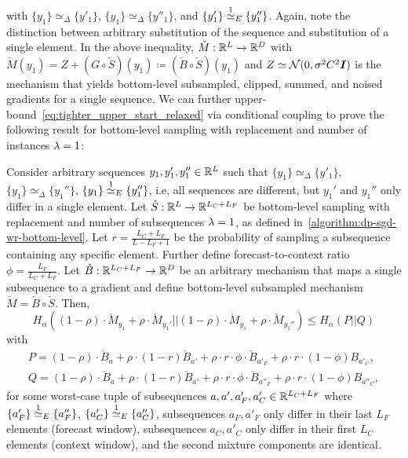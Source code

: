with $\{y_1\} \simeq_\Delta \{y'_1\}$,
$\{y_1\} \simeq_\Delta \{y''_1\}$,
and
$\{y'_1\} \overset{1}{\simeq}_{E} \{y_1''\}$.
Again, note the distinction between arbitrary substitution of the sequence and substitution of a single element. 
In the above inequality, $\check{M} : {\mathbb{R}}^{L} \rightarrow {\mathbb{R}}^{D}$
with $\check{M}(y_1)  = Z + (G \circ \check{S})(y_1) \coloneq (\check{B} \circ \check{S})(y_1)$ and $Z \simeq \mathcal{N}(0, \sigma^2 C^2 {\bm{I}})$
is the mechanism that yields bottom-level subsampled, clipped, summed, and noised gradients for a single sequence.
We can further upper-bound~\cref{eq:tighter_upper_start_relaxed} via conditional coupling to prove the following result for bottom-level sampling with replacement and number of instances $\lambda=1$:
\begin{lemma}\label{lemma:bilevel_reduction_to_single_gradient}
    Consider arbitrary sequences $y_1, y_1', y_1'' \in {\mathbb{R}}^{L}$ such that
    $\{y_1\} \simeq_\Delta \{y'_1\}$,
    $\{y_1\} \simeq_\Delta \{y_1''\}$,
    $\{y_1\} \overset{1}{\simeq}_{E} \{y_1''\}$,
    i.e, all sequences are different, but $y_1'$ and $y_1''$ only differ in a single element.
    Let $\check{S} : {\mathbb{R}}^{L} \rightarrow {\mathbb{R}}^{L_C+L_F}$ be bottom-level sampling with replacement and number of subsequences $\lambda = 1$, as defined in~\cref{algorithm:dp-sgd-wr-bottom-level}.
    Let $r = \frac{L_C + L_F}{L - L_F + 1}$ be the probability of sampling a subsequence containing any specific element.
    Further define forecast-to-context ratio $\phi = \frac{L_F}{L_C + L_F}$.
    Let $\check{B} : {\mathbb{R}}^{L_C + L_F} \rightarrow {\mathbb{R}}^D$ be an arbitrary mechanism that maps a single subsequence to a gradient
    and define bottom-level subsampled mechanism $\check{M} = \check{B} \circ \check{S}$.
    Then,
    \begin{equation*}
        H_\alpha\left((1 - \rho) \cdot \check{M}_{y_1} + \rho \cdot \check{M}_{y_1'}
            ||
            (1 - \rho) \cdot \check{M}_{y_1} + \rho \cdot \check{M}_{y_1''}\right)
        \leq 
        H_\alpha\left(
        P||Q\right)
    \end{equation*}
    with
    \begin{align*}
        P = (1 - \rho) \cdot \check{B}_{a} + \rho \cdot (1-r) \check{B}_{a'} + \rho \cdot r \cdot \phi \cdot   \check{B}_{a'_F} + \rho \cdot r \cdot (1 - \phi) B_{a'_C},
        \\
        Q = (1 - \rho) \cdot \check{B}_{a} + \rho \cdot (1-r) \check{B}_{a'} + \rho \cdot r \cdot \phi \cdot  \check{B}_{a''_F} + \rho \cdot r \cdot (1 - \phi) B_{a''_C},
    \end{align*}
    for some worst-case tuple of subsequences $a, a', a'_F, a'_C \in {\mathbb{R}}^{L_C + L_F}$ where 
    $\{a'_F\} \overset{1}{\simeq}_{E} \{a''_F\}$,
    $\{a'_C\} \overset{1}{\simeq}_{E} \{a''_C\}$,
    subsequences $a_F, a'_F$ only differ in their last $L_F$ elements (forecast window),
    subsequences $a_C, a'_C$ only differ in their first $L_C$ elements (context window), 
    and the second mixture components are identical.
\end{lemma}
